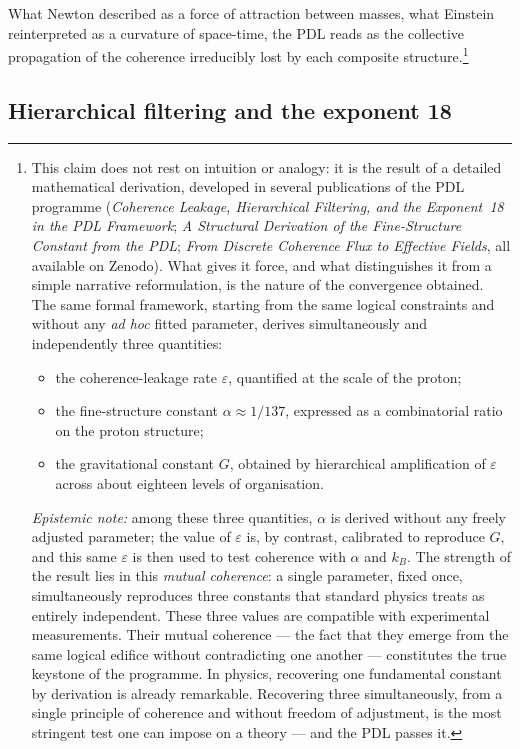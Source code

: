 \documentclass[12pt, a4paper, openright]{book}
\begin{document}
What Newton described as a force of attraction between masses, what Einstein reinterpreted as a curvature of space-time, the PDL reads as the collective propagation of the coherence irreducibly lost by each composite structure.\footnote{%
  This claim does not rest on intuition or analogy: it is the result of a detailed mathematical derivation, developed in several publications of the PDL programme (\textit{Coherence Leakage, Hierarchical Filtering, and the Exponent~18 in the PDL Framework}; \textit{A Structural Derivation of the Fine-Structure Constant from the PDL}; \textit{From Discrete Coherence Flux to Effective Fields}, all available on Zenodo). What gives it force, and what distinguishes it from a simple narrative reformulation, is the nature of the convergence obtained. The same formal framework, starting from the same logical constraints and without any \emph{ad hoc} fitted parameter, derives simultaneously and independently three quantities:
  \begin{itemize}
  \item the coherence-leakage rate $\varepsilon$, quantified at the scale of the proton;
  \item the fine-structure constant $\alpha \approx 1/137$, expressed as a combinatorial ratio on the proton structure;
  \item the gravitational constant $G$, obtained by hierarchical amplification of $\varepsilon$ across about eighteen levels of organisation.
  \end{itemize}
\textit{Epistemic note:} among these three quantities, $\alpha$ is derived without any freely adjusted parameter; the value of $\varepsilon$ is, by contrast, calibrated to reproduce $G$, and this same $\varepsilon$ is then used to test coherence with $\alpha$ and $k_B$. The strength of the result lies in this \emph{mutual coherence}: a single parameter, fixed once, simultaneously reproduces three constants that standard physics treats as entirely independent.
  These three values are compatible with experimental measurements. Their mutual coherence — the fact that they emerge from the same logical edifice without contradicting one another — constitutes the true keystone of the programme. In physics, recovering one fundamental constant by derivation is already remarkable. Recovering three simultaneously, from a single principle of coherence and without freedom of adjustment, is the most stringent test one can impose on a theory — and the PDL passes it.}

\subsection*{Hierarchical filtering and the exponent 18}
\end{document}

